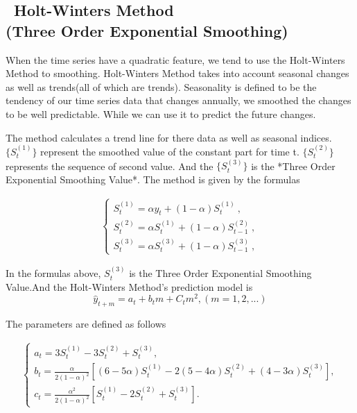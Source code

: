 \documentclass[12pt]{article}
\begin{document}
\subsection{\ Holt-Winters Method \\(Three Order Exponential Smoothing)
}


When the time series have a quadratic feature, we tend to use the Holt-Winters Method to smoothing. Holt-Winters Method takes into account seasonal changes as well as trends(all of which are trends). Seasonality is defined to be the tendency of our time series data that  changes  annually, we  smoothed the changes to be well predictable. While we can use it to predict the future changes.\cite{chatfield1988holt}

The method calculates a trend line for there data as well as seasonal indices. $\{S_t^{(1)}\}$ represent the smoothed value of the constant part for time t. $\{S_t^{(2)}\}$ represents the sequence of second value. And the $\{S_t^{(3)}\}$ is the *Three Order Exponential Smoothing Value*. The method is given by the formulas 

\begin{eqnarray}
\left\{
\begin{array}{ll}
 S^{(1)}_t=\alpha y_t+(1-\alpha)S_t^{(1)}  \  , \\
 S^{(2)}_t=\alpha S^{(1)}_t +(1-\alpha)S_{t-1}^{(2)} \  ,\\
 S^{(3)}_t = \alpha S^{(3)}_t +(1-\alpha)S^{(3)}_{t-1}\ ,
\end{array}\right.\label{equ:dynamicofcollision}
\end{eqnarray}

 In the formulas above, $S^{(3)}_t$ is the Three Order Exponential Smoothing Value.And the Holt-Winters Method's prediction model is
$$
\hat y_{t+m} = a_t + b_tm + C_t m^2, (m = 1,2,...)
$$

The parameters are defined as follows

\begin{eqnarray}
\left \{
  \begin{array}{ll}
  a_t = 3S_t^{(1)} - 3S_t^{(2)} +S_t^{(3)}, \\
  b_t = \frac{\alpha}{2(1-\alpha)^2}[(6-5\alpha)S_t^{(1)} - 2(5-4\alpha)S_t^{(2)}+(4-3\alpha)S_t^{(3)}], \\
  c_t=\frac{\alpha^2}{2(1-\alpha)^2}[S_t^{(1)}-2S_t^{(2)}+S_t^{(3)}].
 
\end{array} \right .
\end{eqnarray}
\end{document}
